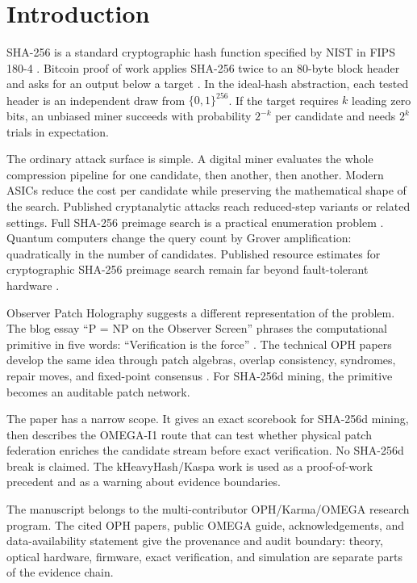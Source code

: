\documentclass[11pt]{article}
\theoremstyle{definition}
\theoremstyle{remark}
\newcommand{\bits}{\{0,1\}}
\begin{document}
\section{Introduction}

SHA-256 is a standard cryptographic hash function specified by NIST in FIPS
180-4 \cite{NISTFIPS1804}. Bitcoin proof of work applies SHA-256 twice to an
80-byte block header and asks for an output below a target \cite{Nakamoto2008}.
In the ideal-hash abstraction, each tested header is an independent draw from
\(\bits^{256}\). If the target requires \(k\) leading zero bits, an unbiased
miner succeeds with probability \(2^{-k}\) per candidate and needs \(2^k\)
trials in expectation.

The ordinary attack surface is simple. A digital miner evaluates the whole
compression pipeline for one candidate, then another, then another. Modern
ASICs reduce the cost per candidate while preserving the mathematical shape of
the search. Published cryptanalytic attacks reach reduced-step variants or related
settings. Full SHA-256 preimage search is a practical enumeration problem
\cite{MendelNadSchlaeffer2013,KhovratovichRechbergerSavelieva2011,AlamgirNejatiBright2024}.
Quantum computers change the query count by Grover amplification: quadratically
in the number of candidates. Published resource estimates for
cryptographic SHA-256 preimage search remain far beyond fault-tolerant
hardware \cite{Grover1997,Zalka1999,AmyEtAl2016,NeremGaur2023}.

Observer Patch Holography suggests a different representation of the problem.
The blog essay ``P = NP on the Observer Screen'' phrases the computational
primitive in five words: ``Verification is the force'' \cite{OPHBlogPNP}. The
technical OPH papers develop the same idea through patch algebras, overlap
consistency, syndromes, repair moves, and fixed-point consensus
\cite{OPHObserversCurrent,OPHConsensusCurrent,OPHScreenCurrent,OPHCompactCurrent}. For SHA-256d mining, the
primitive becomes an auditable patch network.

The paper has a narrow scope. It gives an exact scorebook for SHA-256d mining,
then describes the OMEGA-I1 route that can test whether physical patch
federation enriches the candidate stream before exact verification. No SHA-256d
break is claimed. The kHeavyHash/Kaspa work is used as a proof-of-work
precedent and as a warning about evidence boundaries.

The manuscript belongs to the multi-contributor OPH/Karma/OMEGA research
program. The cited OPH papers, public OMEGA guide, acknowledgements, and
data-availability statement give the provenance and audit boundary: theory,
optical hardware, firmware, exact verification, and simulation are separate
parts of the evidence chain.
\end{document}
